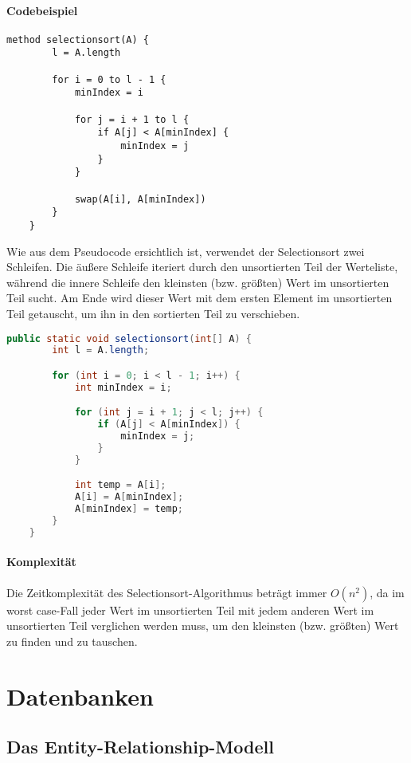 \documentclass{article}
\begin{document}
	\paragraph{Codebeispiel}
	\begin{lstlisting}[caption=Der Selectionsort-Algorithmus in einfachem Pseudocode]
	method selectionsort(A) {
		l = A.length

		for i = 0 to l - 1 {
			minIndex = i

			for j = i + 1 to l {
				if A[j] < A[minIndex] {
					minIndex = j
				}
			}

			swap(A[i], A[minIndex])
		}
	}
	\end{lstlisting}

	Wie aus dem Pseudocode ersichtlich ist, verwendet der Selectionsort zwei Schleifen. Die äußere Schleife iteriert durch den unsortierten Teil der Werteliste, während die innere Schleife den kleinsten (bzw. größten) Wert im unsortierten Teil sucht. Am Ende wird dieser Wert mit dem ersten Element im unsortierten Teil getauscht, um ihn in den sortierten Teil zu verschieben.

	\begin{lstlisting}[language=Java, caption=Der Selectionsort-Algorithmus in Java]
	public static void selectionsort(int[] A) {
		int l = A.length;

		for (int i = 0; i < l - 1; i++) {
			int minIndex = i;

			for (int j = i + 1; j < l; j++) {
				if (A[j] < A[minIndex]) {
					minIndex = j;
				}
			}

			int temp = A[i];
			A[i] = A[minIndex];
			A[minIndex] = temp;
		}
	}
	\end{lstlisting}

	\paragraph{Komplexität}
	Die Zeitkomplexität des Selectionsort-Algorithmus beträgt immer \textbf{$O(n^2)$}, da im worst case-Fall jeder Wert im unsortierten Teil mit jedem anderen Wert im unsortierten Teil verglichen werden muss, um den kleinsten (bzw. größten) Wert zu finden und zu tauschen.


	\section{Datenbanken}
	\subsection{Das Entity-Relationship-Modell}
\end{document}
